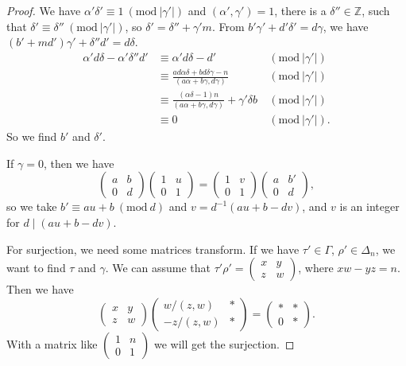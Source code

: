 \documentclass{article}
\newcommand{\Mod}[1]{\ (\mathrm{mod}\ #1)}
\begin{document}
\begin{proof}
    We have $\alpha'\delta'\equiv 1\Mod{|\gamma'|}$ and $(\alpha',\gamma')=1$, there is a $\delta''\in\mathbb{Z}$, such that $\delta'\equiv \delta''\Mod{|\gamma'|}$, so $\delta'=\delta''+\gamma' m$. From $b'\gamma'+d'\delta'=d\gamma$, we have $(b'+md')\gamma'+\delta''d'=d\delta$. 
    \begin{equation*}
        \begin{aligned}
            \alpha'd\delta-\alpha'\delta''d'&\equiv \alpha'd\delta-d' &\Mod{|\gamma'|}\\
            &\equiv \frac{ad\alpha\delta+bd\delta\gamma-n}{(a\alpha+b\gamma,d\gamma)} &\Mod{|\gamma'|}\\
            &\equiv \frac{(\alpha\delta-1)n}{(a\alpha+b\gamma,d\gamma)}+\gamma'\delta b &\Mod{|\gamma'|}\\
            &\equiv 0&\Mod{|\gamma'|}.
        \end{aligned}
    \end{equation*}
    So we find $b'$ and $\delta'$.

    If $\gamma=0$, then we have 
    \[\begin{pmatrix}
        a&b\\
        0&d
    \end{pmatrix}\begin{pmatrix}
        1&u\\
        0&1
    \end{pmatrix}=
    \begin{pmatrix}
        1&v\\
        0&1
    \end{pmatrix}
    \begin{pmatrix}
        a&b'\\
        0&d
    \end{pmatrix},\]
    so we take $b'\equiv au+b\Mod{d}$ and $v=d^{-1}(au+b-dv)$, and $v$ is an integer for $d\mid (au+b-dv)$.

    For surjection, we need some matrices transform. If we have $\tau'\in \Gamma$, $\rho'\in \Delta_n$, we want to find $\tau$ and $\gamma$. We can assume that $\tau'\rho'=\begin{pmatrix}
        x&y\\
        z&w
    \end{pmatrix}$, where $xw-yz=n$. Then we have 
    \[
    \begin{pmatrix}
        x&y\\
        z&w
    \end{pmatrix}
    \begin{pmatrix}
        w/(z,w)&*\\
        -z/(z,w)&*
    \end{pmatrix}=
    \begin{pmatrix}
        *&*\\
        0&*
    \end{pmatrix}.
    \]With a matrix like $\begin{pmatrix}
        1&n\\
        0&1
    \end{pmatrix}$ we will get the surjection.
\end{proof}
\end{document}

